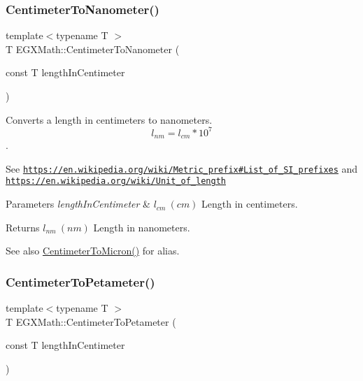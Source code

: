 \subsubsection{\texorpdfstring{Centimeter\+To\+Nanometer()}{CentimeterToNanometer()}}
{\footnotesize\ttfamily template$<$typename T $>$ \\
T E\+G\+X\+Math\+::\+Centimeter\+To\+Nanometer (\begin{DoxyParamCaption}\item[{const T}]{length\+In\+Centimeter }\end{DoxyParamCaption})}



Converts a length in centimeters to nanometers. \[ l_{nm}=l_{cm} * 10^{7} \]. 

See \href{https://en.wikipedia.org/wiki/Metric_prefix#List_of_SI_prefixes}{\tt https\+://en.\+wikipedia.\+org/wiki/\+Metric\+\_\+prefix\#\+List\+\_\+of\+\_\+\+S\+I\+\_\+prefixes} and \href{https://en.wikipedia.org/wiki/Unit_of_length}{\tt https\+://en.\+wikipedia.\+org/wiki/\+Unit\+\_\+of\+\_\+length} 
\begin{DoxyParams}{Parameters}
{\em length\+In\+Centimeter} & $ l_{cm}\ (cm)$ Length in centimeters. \\
\hline
\end{DoxyParams}
\begin{DoxyReturn}{Returns}
$ l_{nm}\ (nm)$ Length in nanometers. 
\end{DoxyReturn}
\begin{DoxySeeAlso}{See also}
\mbox{\hyperlink{group___e_g_x_math-_conversions-_length_conversions-_centimeter-_non-_s_i_gaee509ac676e86ed54994792f82dab9f7}{Centimeter\+To\+Micron()}} for alias. 
\end{DoxySeeAlso}
\mbox{\label{group___e_g_x_math-_conversions-_length_conversions-_centimeter-_s_i_ga8fa14e761d09dc55608c28c2101f2d26}} 
\subsubsection{\texorpdfstring{Centimeter\+To\+Petameter()}{CentimeterToPetameter()}}
{\footnotesize\ttfamily template$<$typename T $>$ \\
T E\+G\+X\+Math\+::\+Centimeter\+To\+Petameter (\begin{DoxyParamCaption}\item[{const T}]{length\+In\+Centimeter }\end{DoxyParamCaption})}



